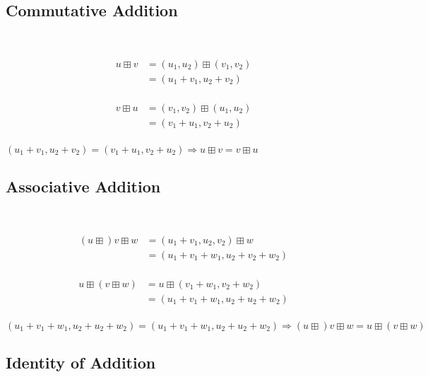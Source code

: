 \documentclass{article}
\begin{document}
\subsection{Commutative Addition}

~

\begin{equation}
\tag{2.2-1}
\begin{split}
u \boxplus v & = (u_1,u_2) \boxplus (v_1,v_2)\\
& =(u_1+v_1,u_2+v_2)\\
\end{split}
\end{equation}

\begin{equation}
\tag{2.2-2}
\begin{split}
v \boxplus u & = (v_1,v_2) \boxplus(u_1,u_2)\\
& = (v_1+u_1,v_2+u_2)\\
\end{split}
\end{equation}

$(u_1+v_1,u_2+v_2) = (v_1+u_1,v_2+u_2) \Rightarrow u \boxplus v = v \boxplus u$

\subsection{Associative Addition}

~

\begin{equation}
\tag{2.3-1}
\begin{split}
(u \boxplus )v\boxplus w & = (u_1+v_1,u_2,v_2)\boxplus w\\
& =(u_1+v_1+w_1,u_2+v_2+w_2)\\
\end{split}
\end{equation}

\begin{equation}
\tag{2.3-2}
\begin{split}
u \boxplus (v\boxplus w) & = u \boxplus (v_1+w_1,v_2+w_2)\\
& = (u_1+v_1+w_1,u_2+u_2+w_2)\\
\end{split}
\end{equation}

$(u_1+v_1+w_1,u_2+u_2+w_2)=(u_1+v_1+w_1,u_2+u_2+w_2) \Rightarrow (u \boxplus )v\boxplus w = u \boxplus (v\boxplus w)$

\subsection{Identity of Addition}
\end{document}
